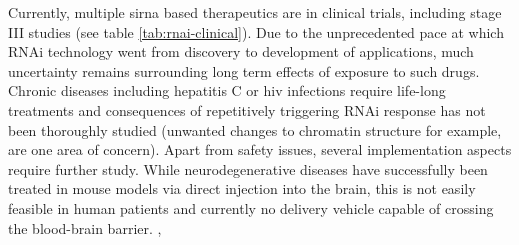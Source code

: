 Currently, multiple \gls{sirna} based therapeutics are in clinical trials, including stage III studies (see table \ref{tab:rnai-clinical}). Due to the unprecedented pace at which RNAi technology went from discovery to development of applications, much uncertainty remains surrounding long term effects of exposure to such drugs. Chronic diseases including hepatitis C or \gls{hiv} infections require life-long treatments and consequences of repetitively triggering RNAi response has not been thoroughly studied (unwanted changes to chromatin structure for example, are one area of concern). Apart from safety issues, several implementation aspects require further study. While neurodegenerative diseases have successfully been treated in mouse models via direct injection into the brain, this is not easily feasible in human patients and currently no delivery vehicle capable of crossing the blood-brain barrier. \citep{Kim2007,Whitehead2009},
